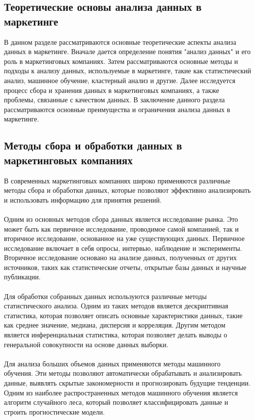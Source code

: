 \documentclass{article}
\begin{document}
\subsection{Теоретические основы анализа данных в маркетинге}
В данном разделе рассматриваются основные теоретические аспекты анализа данных в маркетинге. Вначале дается определение понятия "{}{}анализ данных"{}{} и его роль в маркетинговых компаниях. Затем рассматриваются основные методы и подходы к анализу данных, используемые в маркетинге, такие как статистический анализ, машинное обучение, кластерный анализ и другие. Далее исследуется процесс сбора и хранения данных в маркетинговых компаниях, а также проблемы, связанные с качеством данных. В заключение данного раздела рассматриваются основные преимущества и ограничения анализа данных в маркетинге.
\subsection{Методы сбора и обработки данных в маркетинговых компаниях}
В современных маркетинговых компаниях широко применяются различные методы сбора и обработки данных, которые позволяют эффективно анализировать и использовать информацию для принятия решений.\\
~\\
Одним из основных методов сбора данных является исследование рынка. Это может быть как первичное исследование, проводимое самой компанией, так и вторичное исследование, основанное на уже существующих данных. Первичное исследование включает в себя опросы, интервью, наблюдение и эксперименты. Вторичное исследование основано на анализе данных, полученных от других источников, таких как статистические отчеты, открытые базы данных и научные публикации.\\
~\\
Для обработки собранных данных используются различные методы статистического анализа. Одним из таких методов является дескриптивная статистика, которая позволяет описать основные характеристики данных, такие как среднее значение, медиана, дисперсия и корреляция. Другим методом является инференциальная статистика, которая позволяет делать выводы о генеральной совокупности на основе данных выборки.\\
~\\
Для анализа больших объемов данных применяются методы машинного обучения. Эти методы позволяют автоматически обрабатывать и анализировать данные, выявлять скрытые закономерности и прогнозировать будущие тенденции. Одним из наиболее распространенных методов машинного обучения является алгоритм случайного леса, который позволяет классифицировать данные и строить прогностические модели.\\
\end{document}
